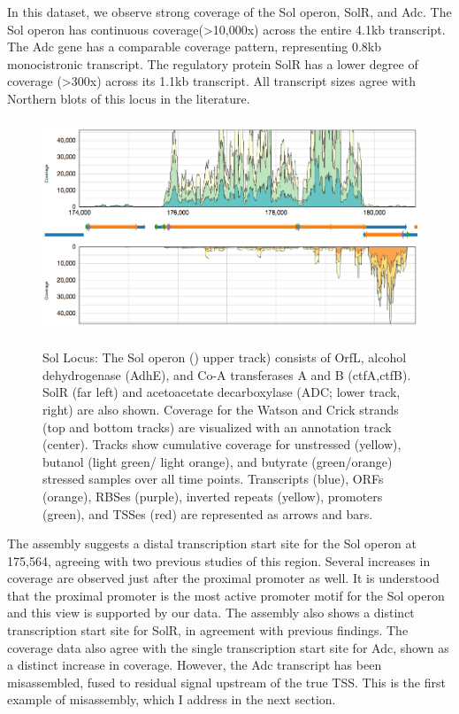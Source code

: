 In this dataset, we observe strong coverage of the Sol operon, SolR, and Adc. The Sol operon has continuous coverage(\textgreater 10,000x) across the entire 4.1kb transcript. The Adc gene has a comparable coverage pattern, representing 0.8kb monocistronic transcript. The regulatory protein SolR has a lower degree of coverage (\textgreater 300x) across its 1.1kb transcript. All transcript sizes agree with Northern blots of this locus in the literature.
\begin{figure}
\small
{\includegraphics[width=\textwidth,height=2.5in]{images/Assembly/Sol/Sol-locus.png}
\label{fig:1a}}
\caption{Sol Locus: The Sol operon () upper track) consists of OrfL, alcohol dehydrogenase (AdhE), and Co-A transferases A and B (ctfA,ctfB). SolR (far left) and acetoacetate decarboxylase (ADC;  lower track, right) are also shown. Coverage for the Watson and Crick strands (top and bottom tracks) are visualized with an annotation track (center). Tracks show cumulative coverage for unstressed (yellow), butanol (light green/ light orange), and butyrate (green/orange) stressed samples over all time points. Transcripts (blue), ORFs (orange), RBSes (purple), inverted repeats (yellow), promoters (green), and TSSes (red) are represented as arrows and bars.}
\end{figure}
The assembly suggests a distal transcription start site for the Sol operon at 175,564, agreeing with two previous studies of this region. Several increases in coverage are observed just after the proximal promoter as well. It is understood that the proximal promoter is the most active promoter motif for the Sol operon and this view is supported by our data. The assembly also shows a distinct transcription start site for SolR, in agreement with previous findings. The coverage data also agree with the single transcription start site for Adc, shown as a distinct increase in coverage. However, the Adc transcript has been misassembled, fused to residual signal upstream of the true TSS. This is the first example of misassembly, which I address in the next section.
